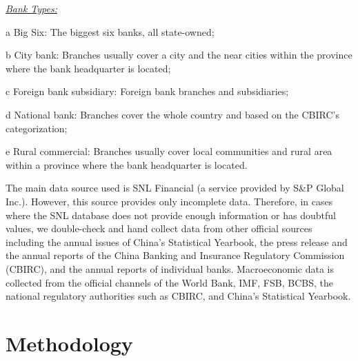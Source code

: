 \documentclass[
  12pt,
  a4paper,
]{scrreprt}
\begin{document}
\begin{table}
{{\begin{threeparttable}
\begin{tablenotes}
\item \underline{\textit{Bank Types:}} 
\item[a] Big Six: The biggest six banks, all state-owned;
\item[b] City bank: Branches usually cover a city and the near cities within the province where the bank headquarter is located;
\item[c] Foreign bank subsidiary: Foreign bank branches and subsidiaries;
\item[d] National bank: Branches cover the whole country and based on the CBIRC's categorization;
\item[e] Rural commercial: Branches usually cover local communities and rural area within a province where the bank headquarter is located.
\end{tablenotes}
\end{threeparttable}}

}

\end{table}%

The main data source used is SNL Financial (a service provided by S\&P
Global Inc.). However, this source provides only incomplete data.
Therefore, in cases where the SNL database does not provide enough
information or has doubtful values, we double-check and hand collect
data from other official sources including the annual issues of China's
Statistical Yearbook, the press release and the annual reports of the
China Banking and Insurance Regulatory Commission (CBIRC), and the
annual reports of individual banks. Macroeconomic data is collected from
the official channels of the World Bank, IMF, FSB, BCBS, the national
regulatory authorities such as CBIRC, and China's Statistical Yearbook.

\section{Methodology}\label{methodology}
\end{document}
